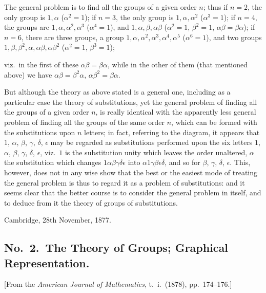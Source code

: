 \documentclass[11pt,a4paper]{article}
\begin{document}
The general problem is to find all the groups of a given order $n$; thus if $n = 2$, the only group is $1, \alpha$ ($\alpha^2 = 1$); if $n = 3$, the only group is $1, \alpha, \alpha^2$ ($\alpha^3 = 1$); if $n = 4$, the groups are $1, \alpha, \alpha^2, \alpha^3$ ($\alpha^4 = 1$), and $1, \alpha, \beta, \alpha\beta$ ($\alpha^2 = 1$, $\beta^2 = 1$, $\alpha\beta = \beta\alpha$); if $n = 6$, there are three groups, a group $1, \alpha, \alpha^2, \alpha^3, \alpha^4, \alpha^5$ ($\alpha^6 = 1$), and two groups $1, \beta, \beta^2, \alpha, \alpha\beta, \alpha\beta^2$ ($\alpha^2 = 1$, $\beta^3 = 1$);

\clearpage
viz.\ in the first of these $\alpha\beta = \beta\alpha$, while in the other of them (that mentioned above) we have $\alpha\beta = \beta^2\alpha$, $\alpha\beta^2 = \beta\alpha$.

But although the theory as above stated is a general one, including as a particular case the theory of substitutions, yet the general problem of finding all the groups of a given order $n$, is really identical with the apparently less general problem of finding all the groups of the same order $n$, which can be formed with the substitutions upon $n$ letters; in fact, referring to the diagram, it appears that $1$, $\alpha$, $\beta$, $\gamma$, $\delta$, $\epsilon$ may be regarded as substitutions performed upon the six letters $1$, $\alpha$, $\beta$, $\gamma$, $\delta$, $\epsilon$, viz.\ $1$ is the substitution unity which leaves the order unaltered, $\alpha$ the substitution which changes $1\alpha\beta\gamma\delta\epsilon$ into $\alpha 1\gamma\beta\epsilon\delta$, and so for $\beta$, $\gamma$, $\delta$, $\epsilon$. This, however, does not in any wise show that the best or the easiest mode of treating the general problem is thus to regard it as a problem of substitutions: and it seems clear that the better course is to consider the general problem in itself, and to deduce from it the theory of groups of substitutions.

Cambridge, 28th November, 1877.

\subsection*{No.\ 2.\ The Theory of Groups; Graphical Representation.}

[From the \textit{American Journal of Mathematics}, t.\ i.\ (1878), pp.\ 174--176.]
\end{document}
